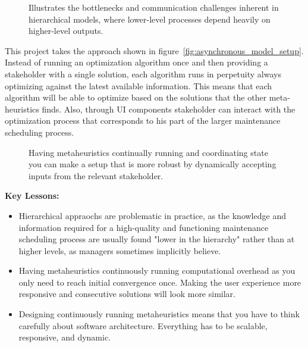 \begin{figure}[H]
	\centering
	
	\caption{
		Illustrates the bottlenecks and communication challenges inherent in hierarchical models, where lower-level processes depend heavily on higher-level outputs.
	}
	\label{fig:model-setup:classic-hierarchical}
\end{figure}

This project takes the approach shown in figure~\ref{fig:asynchronous_model_setup}. 
Instead of running an optimization algorithm once and then providing a stakeholder with a single 
solution, each algorithm runs in perpetuity always optimizing against the latest available information. This means that each algorithm will
be able to optimize based on the solutions that the other meta-heuristics finds. Also, through UI components stakeholder can interact with the
optimization process that corresponds to his part of the larger maintenance scheduling process. 

\begin{figure}[H]
	\centering
	
	\caption{
		Having metaheuristics continually running and coordinating state you can make a setup that is more robust by dynamically accepting inputs from the relevant stakeholder.  
	}
	\label{
		fig:asynchronous_model_setup
	}
\end{figure}

\textbf{Key Lessons:}
\begin{itemize}
	\item Hierarchical appraochs are problematic in practice, as the knowledge and information required for a high-quality and functioning maintenance 
		  scheduling process are usually found "lower in the hierarchy" rather than at higher levels, as managers sometimes implicitly believe.
	\item Having metaheuristics continuously running computational overhead as you only need to reach initial convergence once. Making the 
	      user experience more responsive and consecutive solutions will look more similar.
	\item Designing continuously running metaheuristics means that you have to think carefully about software architecture. Everything has to
		  be scalable, responsive, and dynamic. 
\end{itemize}

